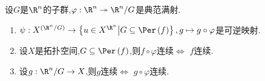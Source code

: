 \begin{proposition}{}{}
	设$G$是$\R^{n}$的子群,$\varphi:\R^{n}\twoheadrightarrow \R^{n}/G$是典范满射.
	\begin{enumerate}
		\item $\psi:X^{\left(\R^{n}/G\right)}\to\left\{u\in X^{\R^{n}}\middle|G\subseteq\Per\left(f\right)\right\},g\mapsto g\circ\varphi$是可逆映射.
		\item 设$X$是拓扑空间,$G\subseteq\Per\left(f\right)$,则$f\circ\varphi$连续$\iff$ $f$连续.
		\item 设$g:\R^{n}/G\to X$,则$g$连续$\iff$ $g\circ\varphi$连续. 
	\end{enumerate}
\end{proposition}